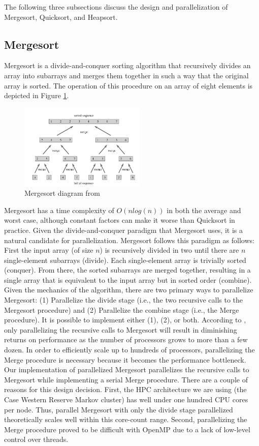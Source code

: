\documentclass[conference]{IEEEtran}
\begin{document}
The following three subsections discuss the design and parallelization of Mergesort, Quicksort, and Heapsort.

\subsection{Mergesort}
Mergesort is a divide-and-conquer sorting algorithm that recursively divides an array into subarrays and merges them together in such a way that the original array is sorted. 
The operation of this procedure on an array of eight elements is depicted in Figure \ref{mrg}.  
\begin{figure}[h]
	\includegraphics[width=6cm]{merge.png} 
	\caption{Mergesort diagram from \cite{cormen_introduction_2009}}
	\label{mrg}
\end{figure}
Mergesort has a time complexity of $O(nlog(n))$ in both the average and worst case, although constant factors can make it worse than Quicksort in practice. 
Given the divide-and-conquer paradigm that Mergesort uses, it is a natural candidate for parallelization. Mergesort follows this paradigm as follows: First the input array (of size $n$) is recursively divided in two until there are $n$ single-element subarrays (divide). Each single-element array is trivially sorted (conquer). From there, the sorted subarrays are merged together, resulting in a single array that is equivalent to the input array but in sorted order (combine). Given the mechanics of the algorithm, there are two primary ways to parallelize Mergesort: (1) Parallelize the divide stage (i.e., the two recursive calls to the Mergesort procedure) and (2) Parallelize the combine stage (i.e., the Merge procedure). It is possible to implement either (1), (2), or both. According to \cite{cormen_introduction_2009}, only parallelizing the recursive calls to Mergesort will result in diminishing returns on performance as the number of processors grows to more than a few dozen. In order to efficiently scale up to hundreds of processors, parallelizing the Merge procedure is necessary because it becomes the performance bottleneck.
Our implementation of parallelized Mergesort parallelizes the recursive calls to Mergesort while implementing a serial Merge procedure. There are a couple of reasons for this design decision. First, the HPC architecture we are using (the Case Western Reserve Markov cluster) has well under one hundred CPU cores per node. Thus, parallel Mergesort with only the divide stage parallelized theoretically scales well within this core-count range. Second, parallelizing the Merge procedure proved to be difficult with OpenMP due to a lack of low-level control over threads.
\end{document}
